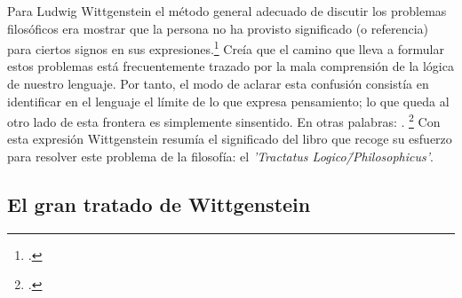 
Para Ludwig Wittgenstein el método general adecuado de discutir los problemas
filosóficos era mostrar que la persona no ha provisto significado (o referencia)
para ciertos signos en sus expresiones.\footcite[cf. p. 151]{IWT} Creía
que el camino que lleva a formular estos problemas está frecuentemente trazado
por la mala comprensión de la lógica de nuestro lenguaje. Por tanto, el modo de
aclarar esta confusión consistía en identificar en el lenguaje el límite de lo
que expresa pensamiento; lo que queda al otro lado de esta frontera es
simplemente sinsentido. En otras palabras: . 
\footcite[prefacio]{tractatus}
Con esta expresión  Wittgenstein resumía el significado del libro que recoge su
esfuerzo para resolver este problema de la filosofía: el \emph{'Tractatus
    Logico\=/Philosophicus'}. 

\subsection{El gran tratado de Wittgenstein}

